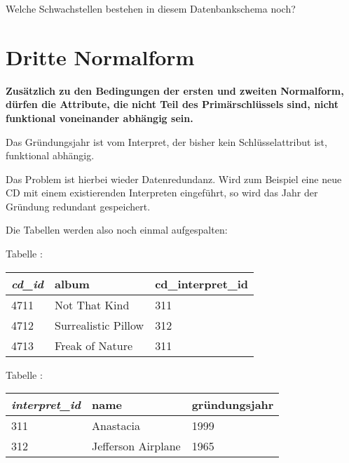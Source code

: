 Welche Schwachstellen bestehen in diesem Datenbankschema noch?


\section{Dritte Normalform}

\textbf{Zusätzlich zu den Bedingungen der ersten und zweiten Normalform, dürfen
die Attribute, die nicht Teil des Primärschlüssels sind, nicht funktional
voneinander abhängig sein.}

Das Gründungsjahr ist vom Interpret, der bisher kein Schlüsselattribut ist,
funktional abhängig.

Das Problem ist hierbei wieder Datenredundanz. Wird zum Beispiel eine neue CD
mit einem existierenden Interpreten eingeführt, so wird das Jahr der Gründung
redundant gespeichert.

Die Tabellen werden also noch einmal aufgespalten:

\begin{minipage}{0.48\textwidth}
Tabelle :

\vspace{2mm}

\hspace{0mm}
\begin{tabular}{|l|l|l|}\hline
\textbf{\em cd\_id} & \textbf{album} & \textbf{cd\_interpret\_id}\\ \hline 
4711 & Not That Kind       & 311\\ \hline
4712 & Surrealistic Pillow & 312\\ \hline
4713 & Freak of Nature     & 311\\ \hline
\end{tabular}
\end{minipage}
\begin{minipage}{0.52\textwidth}
Tabelle :

\vspace{2mm}

\begin{tabular}{|l|l|l|}\hline
\textbf{\em interpret\_id} & \textbf{name} & \textbf{gründungsjahr}\\ \hline
311 & Anastacia          & 1999\\ \hline
312 & Jefferson Airplane & 1965\\ \hline
\end{tabular}
\end{minipage}

\vspace{4mm}

